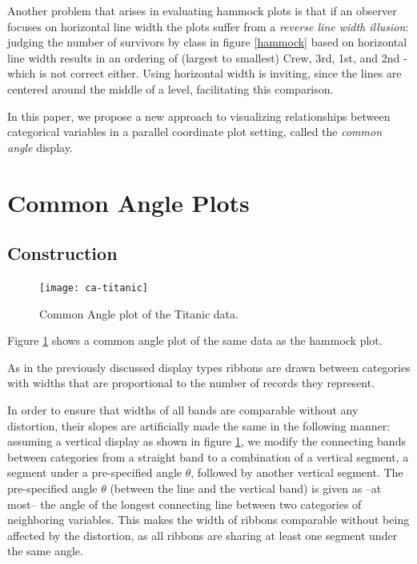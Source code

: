 Another problem that arises in evaluating hammock plots is that if an observer focuses on horizontal line width  the plots suffer from a {\it reverse line width illusion}:  judging the number of survivors by class in figure \ref{hammock} based on horizontal line width  results in an ordering of (largest to smallest) Crew, 3rd, 1st, and 2nd - which is not correct either. Using horizontal width is inviting, since the lines are centered around the middle of a level, facilitating this  comparison. 

In this paper, we propose a new approach to visualizing relationships between categorical variables in a parallel coordinate plot setting, called the {\it common angle} display. 


\section{ Common Angle Plots}
\subsection{Construction}


\begin{figure}[htbp] %
   \centering
   \texttt{[image: ca-titanic]} 
   \caption{ \label{fig:ca-titanic} Common Angle plot of the Titanic data. }
  \end{figure}

Figure \ref{fig:ca-titanic} shows a common angle plot of the same data as the hammock plot.

As in the previously discussed display types ribbons are drawn between categories with widths  that are proportional to  the number of records they represent.

In order to ensure that  widths of all bands are  comparable without any distortion, their slopes  are artificially made the same in the following manner: 
assuming a vertical display as shown in figure \ref{fig:ca-titanic}, we modify  the connecting bands between  categories from a straight band  to a combination of a vertical  segment, a  segment under a pre-specified angle $\theta$, followed by another vertical  segment.  
The pre-specified angle $\theta$ (between the line and the vertical band) is given as --at most-- the angle of the longest connecting line between two categories of neighboring variables. 
This makes the width of ribbons  comparable without being affected by the distortion, as all ribbons are sharing at least one segment under the same angle. 

